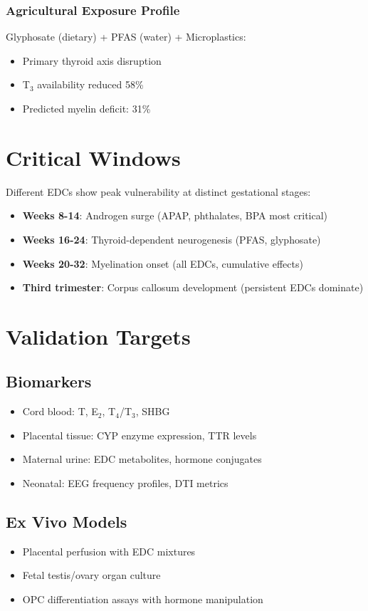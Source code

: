 \documentclass[11pt]{article}
\begin{document}
\subsubsection{Agricultural Exposure Profile}
Glyphosate (dietary) + PFAS (water) + Microplastics:
\begin{itemize}
\item Primary thyroid axis disruption
\item T$_3$ availability reduced 58\%
\item Predicted myelin deficit: 31\%
\end{itemize}

\section{Critical Windows}

Different EDCs show peak vulnerability at distinct gestational stages:

\begin{itemize}
\item \textbf{Weeks 8-14}: Androgen surge (APAP, phthalates, BPA most critical)
\item \textbf{Weeks 16-24}: Thyroid-dependent neurogenesis (PFAS, glyphosate)
\item \textbf{Weeks 20-32}: Myelination onset (all EDCs, cumulative effects)
\item \textbf{Third trimester}: Corpus callosum development (persistent EDCs dominate)
\end{itemize}

\section{Validation Targets}

\subsection{Biomarkers}
\begin{itemize}
\item Cord blood: T, E$_2$, T$_4$/T$_3$, SHBG
\item Placental tissue: CYP enzyme expression, TTR levels
\item Maternal urine: EDC metabolites, hormone conjugates
\item Neonatal: EEG frequency profiles, DTI metrics
\end{itemize}

\subsection{Ex Vivo Models}
\begin{itemize}
\item Placental perfusion with EDC mixtures
\item Fetal testis/ovary organ culture
\item OPC differentiation assays with hormone manipulation
\end{itemize}
\end{document}

